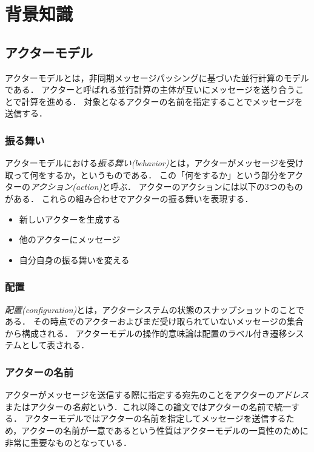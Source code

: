 \chapter{背景知識}
\label{chapter:background}

\section{アクターモデル}

アクターモデル\cite{Agha:1986aa}とは，非同期メッセージパッシングに基づいた並行計算のモデルである．
アクターと呼ばれる並行計算の主体が互いにメッセージを送り合うことで計算を進める．
対象となるアクターの名前を指定することでメッセージを送信する．


\subsection{振る舞い}

アクターモデルにおける\emph{振る舞い(behavior)}とは，アクターがメッセージを受け取って何をするか，というものである．
この「何をするか」という部分をアクターの\emph{アクション(action)}と呼ぶ．
アクターのアクションには以下の3つのものがある．
これらの組み合わせでアクターの振る舞いを表現する．

\begin{itemize}
\item 新しいアクターを生成する
\item 他のアクターにメッセージ
\item 自分自身の振る舞いを変える
\end{itemize}


\subsection{配置}

\emph{配置(configuration)}とは，アクターシステムの状態のスナップショットのことである．
その時点でのアクターおよびまだ受け取られていないメッセージの集合から構成される．
アクターモデルの操作的意味論は配置のラベル付き遷移システムとして表される．

\subsection{アクターの名前}

アクターがメッセージを送信する際に指定する宛先のことをアクターの\emph{アドレス}またはアクターの\emph{名前}という．これ以降この論文ではアクターの名前で統一する．
アクターモデルではアクターの名前を指定してメッセージを送信するため，アクターの名前が一意であるという性質はアクターモデルの一貫性のために非常に重要なものとなっている．

